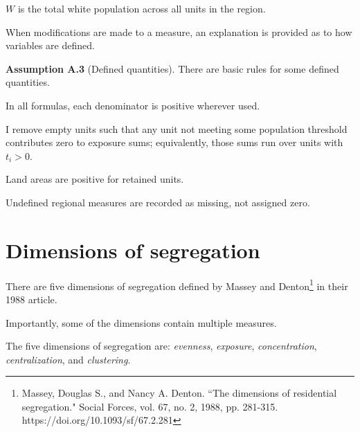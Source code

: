 \documentclass{report}[11pt,letterpaper]
\begin{document}
 $W$ is the total white population across all units in the region.

\medskip

\noindent When modifications are made to a measure, an explanation is provided as to how variables are defined.

\medskip

\noindent \textbf{Assumption A.3} (Defined quantities). There are basic rules for some defined quantities.

In all formulas, each denominator is positive wherever used. 

I remove empty units such that any unit not meeting some population threshold contributes zero to exposure sums; equivalently, those sums run over units with $t_i>0$. 

Land areas are positive for retained units. 

Undefined regional measures are recorded as missing, not assigned zero.

\section{Dimensions of segregation}

There are five dimensions of segregation defined by Massey and Denton\footnote{Massey, Douglas S., and Nancy A. Denton. ``The dimensions of residential segregation." Social Forces, vol. 67, no. 2, 1988, pp. 281-315. https://doi.org/10.1093/sf/67.2.281} in their 1988 article. 

Importantly, some of the dimensions contain multiple measures. 

The five dimensions of segregation are: \textit{evenness},  \textit{exposure}, \textit{concentration}, \textit{centralization}, and \textit{clustering}.
\end{document}
